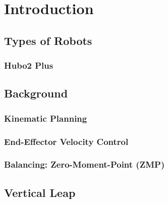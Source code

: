 \section{Introduction}
	
	\subsection{Types of Robots}
		
		\subsubsection{Hubo2 Plus}\label{sec:hubo}
		
	\subsection{Background}
		\subsubsection{Kinematic Planning}
			
		\subsubsection{End-Effector Velocity Control}
			
%			
		\subsubsection{Balancing: Zero-Moment-Point (ZMP)}
			
	\subsection{Vertical Leap}
		

%
%
%
%
%
%

%
%
%

%
%
%
